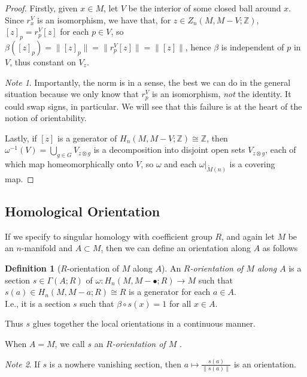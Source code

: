 \documentclass[reqno]{amsart}
\theoremstyle{definition}
\newtheorem{definition}[theorem]{Definition}
\theoremstyle{remark}
\newtheorem*{note}{Note}
\begin{document}
\begin{proof}
    Firstly, given $x \in M$, let $V$ be the interior of some
    closed ball around $x$. Since
    $r_x^{V}$ is an isomorphism, we have
    that, for $z \in Z_n \left( M , M- V; \mathbb{Z} \right) $,
    $\left[ z \right]_p = r_p^{V} \left[ z \right] $ for
    each $p \in V$, so
    $\beta \left( \left[ z \right]_p \right) 
    = \| \left[ z \right]_p \| = 
    \|r_p^{V} \left[ z \right] \| = 
    \|\left[ z \right] \|$, hence
    $\beta$ is independent of $p$ in $V$, thus constant
    on $V_z$.\\
    \linebreak
    \begin{note}
        Importantly, the norm is in a sense, the best we can do in
        the general situation because we only know that
        $r_p^{V}$ is an isomorphism, \textit{not} the identity.
        It could swap signs, in particular. We will see that
        this failure is at the heart of the notion of orientability.
    \end{note}
    Lastly, if $\left[ z \right] $ is a generator
    of $H_n (M, M -V; \mathbb{Z}) \cong \mathbb{Z}$, then
    $\omega^{-1}(V) = 
    \bigcup_{g \in G} V_{z \otimes g}$ is a decomposition into disjoint
    open sets $V_{z \otimes g}$, each of which map
    homeomorphically onto $V$, so $\omega$ and
    each $\omega|_{\tilde{M}(n)}$ is a covering map.
\end{proof}






\subsection{Homological Orientation}

If we specify to singular homology with coefficient
group $R$, and again let $M$ be an $n$-manifold and $A \subset M$,
then we can define an orientation along
$A$ as follows

\begin{definition}[$R$-orientation of $M$ along $A$]
    An \textit{$R$-orientation of $M$ along $A$} is a section
    $s \in \Gamma(A; R)$ of 
    $\omega \colon H_n \left( M , M - \bullet ; R \right) 
    \to M$ such that
    $s(a) \in 
    H_n(M, M-a; R) \cong R$ is a generator
    for each $a \in A$.\\
    I.e., it is a section
    $s$ such that
    $\beta \circ s (x) = 1$ for all $x \in A$.


    Thus $s$ glues together the local orientations in a 
    continuous manner. 

    When $A = M$, we call $s$ an \textit{$R$-orientation of $M$ }.

    \begin{note}
        If $s$ is a nowhere vanishing section, then
        $a \mapsto \frac{s(a)}{\|s(a)\|}$ is an orientation.
    \end{note}




\end{definition}
\end{document}
